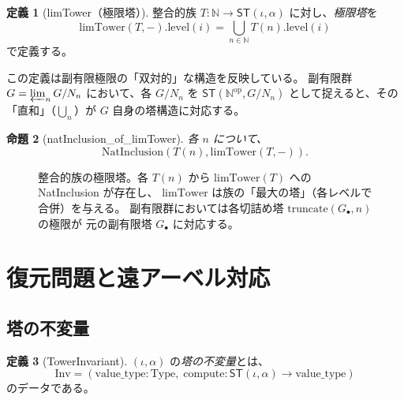 \documentclass[a4paper,11pt]{ltjsarticle}
\theoremstyle{definition}
\newtheorem{definition}{定義}[section]
\theoremstyle{plain}
\newtheorem{proposition}[definition]{命題}
\theoremstyle{remark}
\newcommand{\ST}{\mathsf{ST}}
\newcommand{\lims}{\varprojlim}
\newcommand{\Nat}{\mathbb{N}}
\newcommand{\Nod}{\mathbb{N}^{\mathrm{op}}}
\begin{document}
\begin{definition}[limTower（極限塔）]
\label{def:limtower}
整合的族 $T : \Nat \to \ST(\iota, \alpha)$ に対し、\emph{極限塔}を
\[
  \mathrm{limTower}(T, -).\mathrm{level}(i) = \bigcup_{n \in \Nat} T(n).\mathrm{level}(i)
\]
で定義する。
\end{definition}

\begin{mathinsight}
この定義は副有限極限の「双対的」な構造を反映している。
副有限群 $G = \lims_n G/N_n$ において、各 $G/N_n$ を
$\ST(\Nod, G/N_n)$ として捉えると、その「直和」（$\bigcup_n$）が
$G$ 自身の塔構造に対応する。
\end{mathinsight}

\begin{proposition}[natInclusion\_of\_limTower]
各 $n$ について、
\[
  \mathrm{NatInclusion}(T(n), \mathrm{limTower}(T, -)).
\]
\end{proposition}

\begin{figure}[H]
\centering
{}
\caption{整合的族の極限塔。各 $T(n)$ から $\mathrm{limTower}(T)$ への NatInclusion が存在し、
$\mathrm{limTower}$ は族の「最大の塔」（各レベルで合併）を与える。
副有限群においては各切詰め塔 $\mathrm{truncate}(G_{\bullet}, n)$ の極限が
元の副有限塔 $G_{\bullet}$ に対応する。}
\label{fig:limtower}
\end{figure}

\section{復元問題と遠アーベル対応}
\label{sec:reconstruction}

\subsection{塔の不変量}

\begin{definition}[TowerInvariant]
$(\iota, \alpha)$ の\emph{塔の不変量}とは、
\[
  \mathrm{Inv} = (\mathrm{value\_type} : \mathrm{Type},\;
                 \mathrm{compute} : \ST(\iota, \alpha) \to \mathrm{value\_type})
\]
のデータである。
\end{definition}
\end{document}
